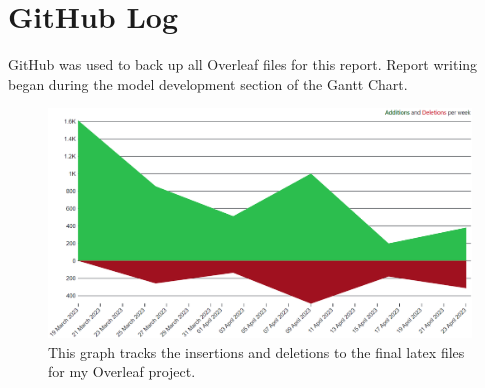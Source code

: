 \chapter{GitHub Log}

GitHub was used to back up all Overleaf files for this report. Report writing began during the model development section of the Gantt Chart. 


\begin{figure}[!htb]
    \includegraphics[width=13cm,center]{Figures/GithubGraph.png}
    \caption{This graph tracks the insertions and deletions to the final latex files for my Overleaf project.}
    \label{Figure:GithubGraph}
\end{figure}